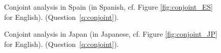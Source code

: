 \begin{figure}[h!]
    \caption[Conjoint analysis in Spain (Spanish)]{Conjoint analysis in Spain (in Spanish, cf. Figure \ref{fig:conjoint_ES} for English). \hfill (Question~\ref{q:conjoint}).
    }\label{fig:conjoint_ES_original}
\end{figure}

\begin{figure}[h!]
    \caption[Conjoint analysis in Japan (Japanese)]{Conjoint analysis in Japan (in Japanese, cf. Figure \ref{fig:conjoint_JP} for English). \hfill (Question~\ref{q:conjoint}).
    }\label{fig:conjoint_JP_original}
\end{figure}

